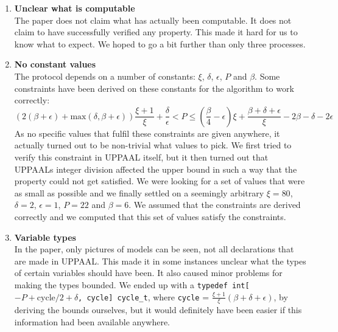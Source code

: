 \documentclass[a4paper,10pt]{article}
\newcommand{\UPPAAL}{UPPAAL\xspace}
\begin{document}
\begin{enumerate}
\item \textbf{Unclear what is computable} \\
	The paper does not claim what has actually been computable. It does not claim to have successfully verified any property. This made it hard for us to know what to expect. We hoped to go a bit further than only three processes.

\item \textbf{No constant values} \\
	The protocol depends on a number of constants: \(\xi\), \(\delta\), \(\epsilon\), \(P\) and \(\beta\). Some constraints have been derived on these constants for the algorithm to work correctly:
	\[ (2(\beta+\epsilon)+\textrm{max}(\delta,\beta+\epsilon))\frac{\xi+1}{\xi} + \frac{\delta}{\epsilon} < P \le (\frac{\beta}{4}-\epsilon)\xi + \frac{\beta+\delta+\epsilon}{\xi}-2\beta-\delta-2\epsilon \]
	As no specific values that fulfil these constraints are given anywhere, it actually turned out to be non-trivial what values to pick. We first tried to verify this constraint in \UPPAAL itself, but it then turned out that \UPPAAL{}s integer division affected the upper bound in such a way that the property could not get satisfied. We were looking for a set of values that were as small as possible and we finally settled on a seemingly arbitrary \(\xi=80\), \(\delta=2\), \(\epsilon=1\), \(P=22\) and \(\beta=6\). We assumed that the constraints are derived correctly and we computed that this set of values satisfy the constraints.

\item \textbf{Variable types} \\
	In the paper, only pictures of models can be seen, not all declarations that are made in \UPPAAL. This made it in some instances unclear what the types of certain variables should have been. It also caused minor problems for making the types bounded. We ended up with a \texttt{typedef int[\(-P+\text{cycle}/2+\delta\), cycle] cycle\_t}, where \texttt{cycle} = \(\frac{\xi+1}{\xi}(\beta+\delta+\epsilon)\), by deriving the bounds ourselves, but it would definitely have been easier if this information had been available anywhere.
\end{enumerate}

\end{document}

